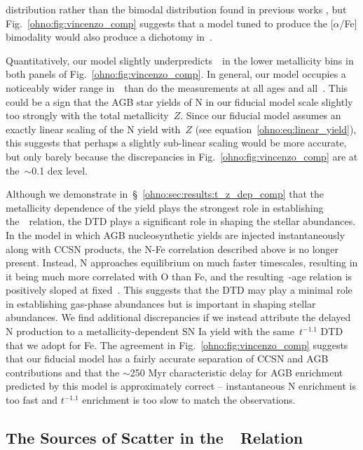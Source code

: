 distribution rather than the bimodal distribution found in previous works
\citep[e.g.][]{Hayden2015, Vincenzo2021b}, but Fig.~\ref{ohno:fig:vincenzo_comp}
suggests that a model tuned to produce the [$\alpha$/Fe] bimodality would also
produce a dichotomy in~\no.
\par
Quantitatively, our model slightly underpredicts~\no~in the lower metallicity
bins in both panels of Fig.~\ref{ohno:fig:vincenzo_comp}.
In general, our model occupies a noticeably wider range in~\no~than do the
\citet{Vincenzo2021b} measurements at all ages and all~\ofe.
This could be a sign that the AGB star yields of N in our fiducial model scale
slightly too strongly with the total metallicity~$Z$.
Since our fiducial model assumes an exactly linear scaling of the N yield
with~$Z$ (see equation~\ref{ohno:eq:linear_yield}), this suggests that perhaps a
slightly sub-linear scaling would be more accurate, but only barely because
the discrepancies in Fig.~\ref{ohno:fig:vincenzo_comp} are at the~$\sim$0.1 dex
level.
\par
Although we demonstrate in~\S~\ref{ohno:sec:results:t_z_dep_comp} that the
metallicity dependence of the yield plays the strongest role in establishing
the~\ohno~relation, the DTD plays a significant role in shaping the stellar
abundances.
In the model in which AGB nucleosynthetic yields are injected instantaneously
along with CCSN products, the N-Fe correlation described above is no longer
present.
Instead, N approaches equilibrium on much faster timescales, resulting in it
being much more correlated with O than Fe, and the resulting~\no-age relation
is positively sloped at fixed~\feh.
This suggests that the DTD may play a minimal role in establishing gas-phase
abundances but is important in shaping stellar abundances.
We find additional discrepancies if we instead attribute the delayed N
production to a metallicity-dependent SN Ia yield with the same~$t^{-1.1}$ DTD
that we adopt for Fe.
The agreement in Fig.~\ref{ohno:fig:vincenzo_comp} suggests that our fiducial model
has a fairly accurate separation of CCSN and AGB contributions and that the
$\sim$250 Myr characteristic delay for AGB enrichment predicted by this model
is approximately correct -- instantaneous N enrichment is too fast and
$t^{-1.1}$ enrichment is too slow to match the observations.

\subsection{The Sources of Scatter in the~\ohno~Relation}
\label{ohno:sec:results:schaefer_comp}

